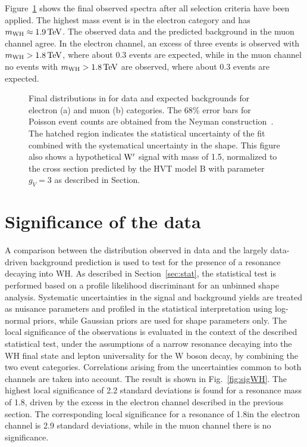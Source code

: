 Figure~\ref{fig:mWH-final} shows the final observed \mWH spectra after all selection criteria have been applied.
The highest mass event is in the electron category and has $m_{\rm WH} \approx 1.9\,\text{Te\hspace{-.08em}V}$.
The observed data and the predicted background in the muon channel agree.
In the electron channel, an excess of three events is observed with $m_{\rm WH} > 1.8\,\text{Te\hspace{-.08em}V}$, where about 0.3 events are expected,
while in the muon channel no events with $m_{\rm WH} > 1.8\,\text{Te\hspace{-.08em}V}$ are observed, where about 0.3 events are expected.

\begin{figure}[!htb]
\centering
{}
\caption{
Final distributions in \mWH for data and expected backgrounds for electron (a) and muon (b) categories.
The 68\% error bars for Poisson event counts are obtained from the Neyman construction~\cite{Garwood}. The hatched region indicates the statistical uncertainty of the fit combined with the systematical uncertainty in the shape. This figure also shows a hypothetical $\mathrm{W}^\prime$ signal with mass of 1.5\TeV, normalized to the cross section predicted by the HVT model B with parameter $g_V=3$ as described in Section.
}
\label{fig:mWH-final}
\end{figure}

\section{Significance of the data}\label{sec:signif8TeV}

A comparison between the \mWH distribution observed in data and the largely data-driven
background prediction is used to test for the presence of a resonance decaying into WH.
As described in Section~\ref{sec:stat}, the statistical test is performed based on a profile likelihood discriminant for an unbinned shape analysis.
Systematic uncertainties in the signal and background yields are treated as nuisance parameters and profiled in the statistical interpretation using log-normal priors,
while Gaussian priors are used for shape parameters only.
The local significance of the observations is evaluated in the context of the described statistical test,
under the assumptions of a narrow resonance decaying into the WH final state and lepton universality for the W boson decay, by combining the two event categories.
Correlations arising from the uncertainties common to both channels are taken into account.
The result is shown in Fig.~\ref{fig:sigWH}. The highest local significance of 2.2 standard deviations is found for a resonance mass of 1.8\TeV, driven by the excess in the electron channel described in the previous section.
The corresponding local significance for a resonance of 1.8\TeV in the electron channel is 2.9 standard deviations, while in the muon channel there is no significance.

